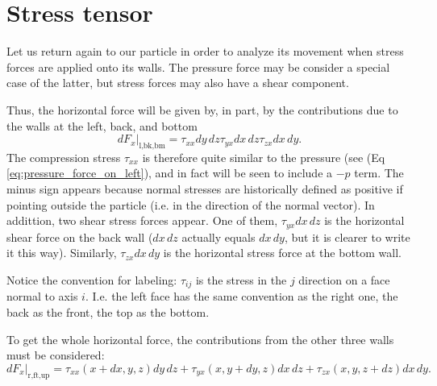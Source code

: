 \section{Stress tensor}

Let us return again to our particle in order to analyze its movement
when stress forces are applied onto its walls. The pressure force may
be consider a special case of the latter, but stress forces may also
have a shear component.

Thus, the horizontal force will be given by, in part, by the
contributions due to the walls at the left, back, and bottom
\begin{equation}
  \label{eq:wall_shear_stress}
  \left. dF_x \right|_\text{l,bk,bm} =
    \tau_{xx} dy\, dz
    \tau_{yx} dx\, dz
    \tau_{zx} dx\, dy .
\end{equation}
%
The compression stress $\tau_{xx}$ is therefore quite similar to the
pressure (see (Eq  \ref{eq:pressure_force_on_left}), and in fact
will be seen to include a $-p$ term. The minus sign appears because
normal stresses are historically defined as positive if pointing
outside the particle (i.e. in the direction of the normal vector).
%
In addittion, two shear stress forces appear. One of them, $\tau_{yx}
dx\, dz$ is the horizontal shear force on the back wall ($dx\, dz$
actually equals $dx\, dy$, but it is clearer to write it this
way). Similarly, $\tau_{zx} dx\, dy $ is the horizontal stress force
at the bottom wall.

Notice the convention for labeling: $\tau_{ij}$ is the stress in the
$j$ direction on a face normal to axis $i$. I.e. the left face has the
same convention as the right one, the back as the front, the top as
the bottom.


To get the whole horizontal force, the contributions from the other
three walls must be considered:
\[
\left. dF_x \right|_\text{r,ft,up} =
  \tau_{xx}(x+dx,y   ,z   )  dy\, dz +
  \tau_{yx}(x   ,y+dy,z   )  dx\, dz +
  \tau_{zx}(x   ,y   ,z+dz)  dx\, dy .
\]

